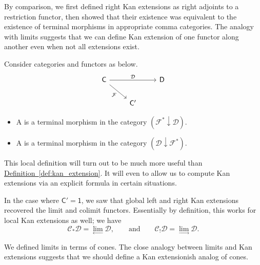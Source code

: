 \documentclass[notes.tex]{subfiles}
\begin{document}
By comparison, we first defined right Kan extensions as right adjoints to a restriction functor, then showed that their existence was equivalent to the existence of terminal morphisms in appropriate comma categories. The analogy with limits suggests that we can define Kan extension of one functor along another even when not all extensions exist.

\begin{definition}
  \label{def:local_kan_extension}
  Consider categories and functors as below.
  \begin{equation*}
    \begin{tikzcd}
      \mathsf{C}
      \arrow[dr, swap, "\mathcal{F}"]
      \arrow[rr, "\mathcal{D}"]
      && \mathsf{D}
      \\
      & \mathsf{C'}
    \end{tikzcd}
  \end{equation*}
  \begin{itemize}
    \item A  is a terminal morphism in the category $(\mathcal{F}^{*} \downarrow \mathcal{D})$.

    \item A  is a terminal morphism in the category $(\mathcal{D}\downarrow \mathcal{F}^{*})$.
  \end{itemize}
\end{definition}

This local definition will turn out to be much more useful than \hyperref[def:kan_extension]{Definition~\ref*{def:kan_extension}}. It will even to allow us to compute Kan extensions via an explicit formula in certain situations.

\begin{example}
  In the case where $\mathsf{C}' = \mathsf{1}$, we saw that global left and right Kan extensions recovered the limit and colimit functors. Essentially by definition, this works for local Kan extensions as well; we have
  \begin{equation*}
    \mathcal{C}_{*}\mathcal{D} = \lim_{\leftarrow} \mathcal{D},\qquad \text{and}\qquad \mathcal{C}_{!}\mathcal{D} = \lim_{\rightarrow} \mathcal{D}.
  \end{equation*}
\end{example}

We defined limits in terms of cones. The close analogy between limits and Kan extensions suggests that we should define a Kan extensionish analog of cones.
\end{document}
